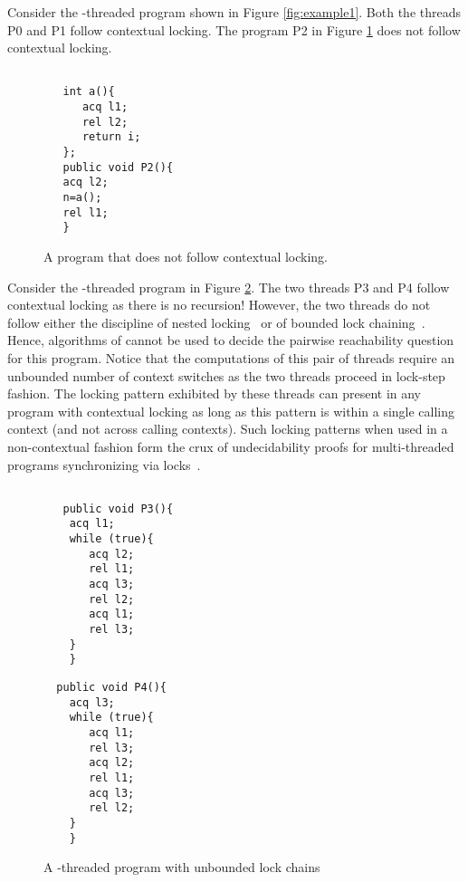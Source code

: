 \documentclass{LMCS}
\begin{document}
\begin{example}
\label{exam:example2}
Consider the -threaded program shown in Figure \ref{fig:example1}. Both the threads P0 and
P1 follow contextual locking. The program P2 in Figure \ref{fig:example2} does not follow contextual locking.
\begin{figure}[ht]
\begin{verbatim}

   int a(){
      acq l1;
      rel l2;
      return i;
   };
   public void P2(){
   acq l2;
   n=a();
   rel l1;
   }
\end{verbatim}

\caption{A program that does not follow contextual locking.}
\label{fig:example2}
\end{figure}

\end{example}
\begin{example}
\label{exam:example3}
Consider the -threaded program in Figure \ref{fig:example3}. The
two threads P3 and P4 follow contextual locking as there is no
recursion! However, the two threads do not follow either the
discipline of nested locking~\cite{kig05} or of bounded lock
chaining~\cite{kah09}. Hence, algorithms of \cite{kig05,kah09} cannot
be used to decide the pairwise reachability question for this
program. Notice that the computations of this pair of threads require
an unbounded number of context switches as the two threads proceed in
lock-step fashion. The locking pattern exhibited by these threads can
present in any program with contextual locking as long as this pattern
is within a single calling context (and not across calling
contexts). Such locking patterns when used in a non-contextual fashion
form the crux of undecidability proofs for multi-threaded programs
synchronizing via locks~\cite{kig05}.

\begin{figure}[ht]
\begin{minipage}{0.5\textwidth}
\begin{verbatim}

   public void P3(){
    acq l1;
    while (true){
       acq l2;
       rel l1;
       acq l3;
       rel l2;
       acq l1;
       rel l3;
    }
    }
   \end{verbatim}

\end{minipage}\begin{minipage}{0.5\textwidth}
\begin{verbatim}
  public void P4(){
    acq l3;
    while (true){
       acq l1;
       rel l3;
       acq l2;
       rel l1;
       acq l3;
       rel l2;
    }
    }
   \end{verbatim}

\end{minipage}

\caption{A -threaded program with unbounded lock chains}
\label{fig:example3}
\end{figure}



\end{example}
\end{document}
